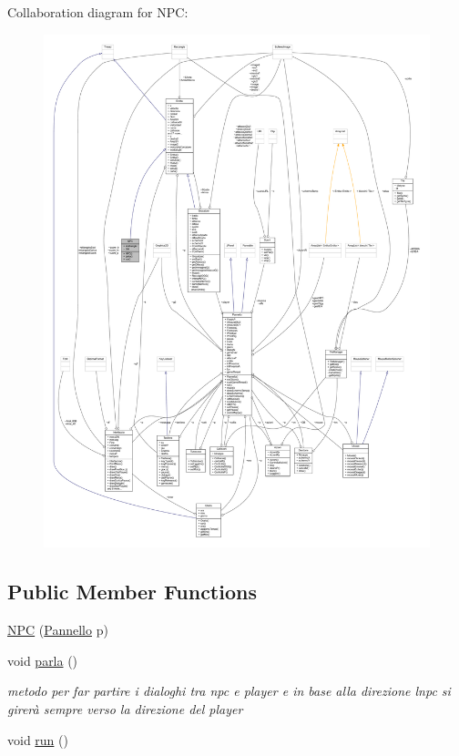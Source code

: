Collaboration diagram for N\+PC\+:
\nopagebreak
\begin{figure}[H]
\begin{center}
\leavevmode
\includegraphics[width=350pt]{class_entita_1_1_n_p_c__coll__graph}
\end{center}
\end{figure}
\subsection*{Public Member Functions}
\begin{DoxyCompactItemize}
\item 
\hyperlink{class_entita_1_1_n_p_c_a1768c917a5c9f132e9edae07318c9aac}{N\+PC} (\hyperlink{classa_1_1survival_1_1game_1_1_pannello}{Pannello} p)
\item 
void \hyperlink{class_entita_1_1_n_p_c_a8310c90e226ac9bc11547a3adb9cd0f3}{parla} ()
\begin{DoxyCompactList}\small\item\em metodo per far partire i dialoghi tra npc e player e in base alla direzione l\textquotesingle{}npc si girerà sempre verso la direzione del player \end{DoxyCompactList}\item 
void \hyperlink{class_entita_1_1_n_p_c_a13a43e6d814de94978c515cb084873b1}{run} ()
\end{DoxyCompactItemize}
